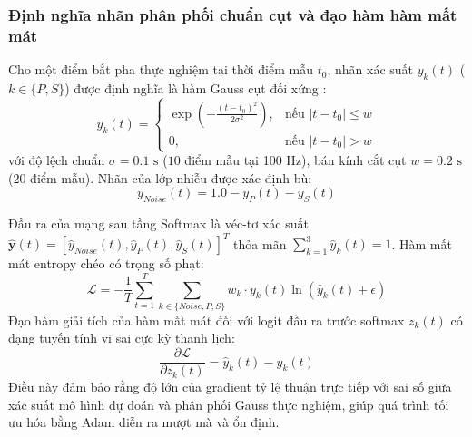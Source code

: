 \documentclass[preprint,1p]{elsarticle}
\begin{document}
\subsubsection{Định nghĩa nhãn phân phối chuẩn cụt và đạo hàm hàm mất mát}
Cho một điểm bắt pha thực nghiệm tại thời điểm mẫu $t_0$, nhãn xác suất $y_k(t)$ ($k \in \{P, S\}$) được định nghĩa là hàm Gauss cụt đối xứng \cite{zhu2019phasenet}:
\begin{equation}
y_k(t) = \begin{cases}
\exp\left(-\frac{(t - t_0)^2}{2\sigma^2}\right), & \text{nếu } |t - t_0| \le w \\
0, & \text{nếu } |t - t_0| > w
\end{cases}
\label{eq:trunc_gauss}
\end{equation}
với độ lệch chuẩn $\sigma = 0.1\text{ s}$ ($10$ điểm mẫu tại 100 Hz), bán kính cắt cụt $w = 0.2\text{ s}$ ($20$ điểm mẫu). Nhãn của lớp nhiễu được xác định bù:
\begin{equation}
y_{Noise}(t) = 1.0 - y_P(t) - y_S(t)
\label{eq:noise_label}
\end{equation}

Đầu ra của mạng sau tầng Softmax là véc-tơ xác suất $\hat{\mathbf{y}}(t) = [\hat{y}_{Noise}(t), \hat{y}_P(t), \hat{y}_S(t)]^T$ thỏa mãn $\sum_{k=1}^{3} \hat{y}_k(t) = 1$. Hàm mất mát entropy chéo có trọng số phạt:
\begin{equation}
\mathcal{L} = -\frac{1}{T} \sum_{t=1}^{T} \sum_{k \in \{Noise, P, S\}} w_k \cdot y_k(t) \ln\left(\hat{y}_k(t) + \epsilon\right)
\label{eq:ce_loss}
\end{equation}
Đạo hàm giải tích của hàm mất mát đối với logit đầu ra trước softmax $z_k(t)$ có dạng tuyến tính vi sai cực kỳ thanh lịch:
\begin{equation}
\frac{\partial \mathcal{L}}{\partial z_k(t)} = \hat{y}_k(t) - y_k(t)
\label{eq:loss_gradient}
\end{equation}
Điều này đảm bảo rằng độ lớn của gradient tỷ lệ thuận trực tiếp với sai số giữa xác suất mô hình dự đoán và phân phối Gauss thực nghiệm, giúp quá trình tối ưu hóa bằng Adam diễn ra mượt mà và ổn định.
\end{document}

